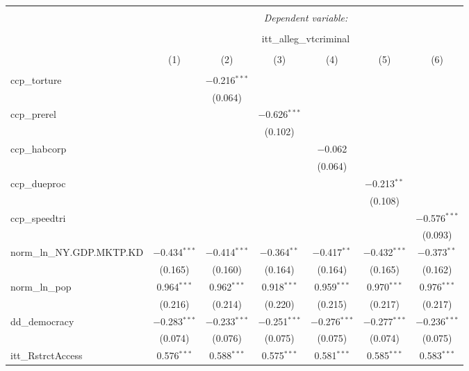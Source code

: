 
\begin{sidewaystable}[!htbp] \centering 
  \caption{} 
  \label{} 
\tiny 
\begin{tabular}{@{\extracolsep{5pt}}lcccccc} 
\\[-1.8ex]\hline 
\hline \\[-1.8ex] 
 & \multicolumn{6}{c}{\textit{Dependent variable:}} \\ 
\cline{2-7} 
\\[-1.8ex] & \multicolumn{6}{c}{itt\_alleg\_vtcriminal} \\ 
\\[-1.8ex] & (1) & (2) & (3) & (4) & (5) & (6)\\ 
\hline \\[-1.8ex] 
 ccp\_torture &  & $-$0.216$^{***}$ &  &  &  &  \\ 
  &  & (0.064) &  &  &  &  \\ 
  ccp\_prerel &  &  & $-$0.626$^{***}$ &  &  &  \\ 
  &  &  & (0.102) &  &  &  \\ 
  ccp\_habcorp &  &  &  & $-$0.062 &  &  \\ 
  &  &  &  & (0.064) &  &  \\ 
  ccp\_dueproc &  &  &  &  & $-$0.213$^{**}$ &  \\ 
  &  &  &  &  & (0.108) &  \\ 
  ccp\_speedtri &  &  &  &  &  & $-$0.576$^{***}$ \\ 
  &  &  &  &  &  & (0.093) \\ 
  norm\_ln\_NY.GDP.MKTP.KD & $-$0.434$^{***}$ & $-$0.414$^{***}$ & $-$0.364$^{**}$ & $-$0.417$^{**}$ & $-$0.432$^{***}$ & $-$0.373$^{**}$ \\ 
  & (0.165) & (0.160) & (0.164) & (0.164) & (0.165) & (0.162) \\ 
  norm\_ln\_pop & 0.964$^{***}$ & 0.962$^{***}$ & 0.918$^{***}$ & 0.959$^{***}$ & 0.970$^{***}$ & 0.976$^{***}$ \\ 
  & (0.216) & (0.214) & (0.220) & (0.215) & (0.217) & (0.217) \\ 
  dd\_democracy & $-$0.283$^{***}$ & $-$0.233$^{***}$ & $-$0.251$^{***}$ & $-$0.276$^{***}$ & $-$0.277$^{***}$ & $-$0.236$^{***}$ \\ 
  & (0.074) & (0.076) & (0.075) & (0.075) & (0.074) & (0.075) \\ 
  itt\_RstrctAccess & 0.576$^{***}$ & 0.588$^{***}$ & 0.575$^{***}$ & 0.581$^{***}$ & 0.585$^{***}$ & 0.583$^{***}$ \\ 

\end{tabular}
\end{sidewaystable}
